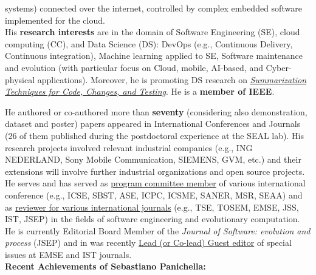 \documentclass[10pt]{article}
\begin{document}
systems) connected over the internet, controlled by complex embedded software implemented for the cloud.\\
His  \textbf{research interests} are in the domain of Software Engineering (SE), cloud computing (CC), and Data Science (DS): DevOps (e.g., Continuous Delivery, Continuous integration), Machine learning applied to SE, Software maintenance and evolution (with particular focus on Cloud, mobile, AI-based, and Cyber-physical applications). Moreover, he is promoting DS research on \href{https://doi.org/10.1109/VST.2018.8327148}{\textit{Summarization Techniques for Code, Changes, and Testing}}. He is a \textbf{member of IEEE}. 
\vspace{1mm}

He authored or co-authored more than \textbf{seventy} (considering also demonstration, dataset 
  and poster) papers appeared in International Conferences and Journals (26 of them published during the postdoctoral experience at the SEAL lab). His research projects involved relevant industrial companies (e.g., ING NEDERLAND, Sony Mobile Communication, SIEMENS, GVM, etc.) and their extensions will involve further industrial organizations and open source projects. He serves and has served as \href{https://spanichella.github.io/\#services}{program committee member} of various international conference (e.g., ICSE, SBST, ASE, ICPC, ICSME, SANER, MSR, SEAA) and as \href{https://spanichella.github.io/\#services}{reviewer for various international journals} (e.g., TSE, TOSEM, EMSE, JSS, IST, JSEP) in the fields of software engineering and evolutionary computation. He is currently Editorial Board Member of the \textit{Journal of Software: evolution and process} (JSEP) and in was recently \href{https://spanichella.github.io/\#services}{Lead (or Co-lead) Guest editor} of special issues at EMSE and IST journals.\\


\textbf{Recent Achievements of Sebastiano Panichella:}
\end{document}
